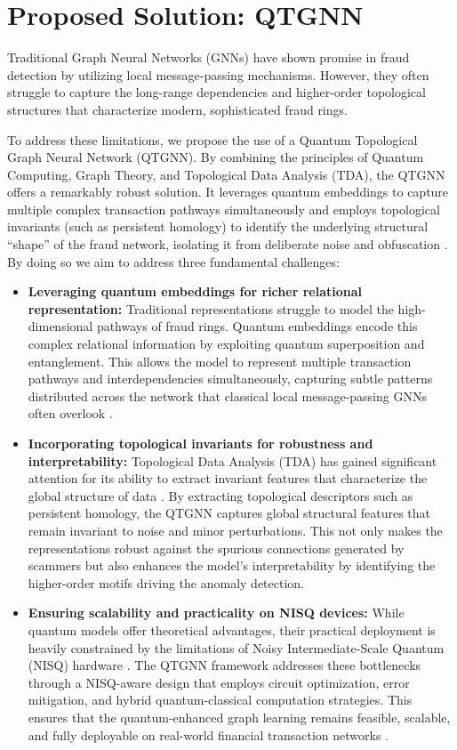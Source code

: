 \section{Proposed Solution: QTGNN}
Traditional Graph Neural Networks (GNNs) have shown promise in fraud detection by utilizing local message-passing mechanisms. However, they often struggle to capture the long-range dependencies and higher-order topological structures that characterize modern, sophisticated fraud rings. 

To address these limitations, we propose the use of a Quantum Topological Graph Neural Network (QTGNN). By combining the principles of Quantum Computing, Graph Theory, and Topological Data Analysis (TDA), the QTGNN offers a remarkably robust solution. It leverages quantum embeddings to capture multiple complex transaction pathways simultaneously and employs topological invariants (such as persistent homology) to identify the underlying structural ``shape'' of the fraud network, isolating it from deliberate noise and obfuscation \cite{mainarticle}.
By doing so we aim to address three fundamental challenges:
\begin{itemize}
    \item \textbf{Leveraging quantum embeddings for richer relational representation:} Traditional representations struggle to model the high-dimensional pathways of fraud rings. Quantum embeddings encode this complex relational information by exploiting quantum superposition and entanglement. This allows the model to represent multiple transaction pathways and interdependencies simultaneously, capturing subtle patterns distributed across the network that classical local message-passing GNNs often overlook \cite{mainarticle}.
    
    \item \textbf{Incorporating topological invariants for robustness and interpretability:} Topological Data Analysis (TDA) has gained significant attention for its ability to extract invariant features that characterize the global structure of data \cite{monkam2024}. By extracting topological descriptors such as persistent homology, the QTGNN captures global structural features that remain invariant to noise and minor perturbations. This not only makes the representations robust against the spurious connections generated by scammers but also enhances the model's interpretability by identifying the higher-order motifs driving the anomaly detection.
    
    \item \textbf{Ensuring scalability and practicality on NISQ devices:} While quantum models offer theoretical advantages, their practical deployment is heavily constrained by the limitations of Noisy Intermediate-Scale Quantum (NISQ) hardware \cite{umeda2019}. The QTGNN framework addresses these bottlenecks through a NISQ-aware design that employs circuit optimization, error mitigation, and hybrid quantum-classical computation strategies. This ensures that the quantum-enhanced graph learning remains feasible, scalable, and fully deployable on real-world financial transaction networks \cite{mainarticle}.
\end{itemize}


